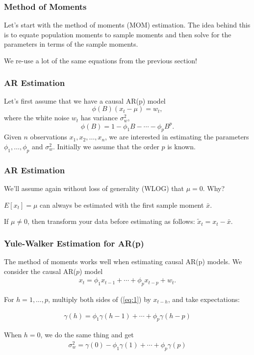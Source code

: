 \documentclass[%
xcolor=pdftex]{beamer}
\begin{document}
\begin{frame}
\frametitle{Method of Moments}

Let's start with the method of moments (MOM) estimation. The idea behind this is to equate population moments to sample moments and then solve for the parameters in terms of the sample moments.
\newline

We re-use a lot of the same equations from the previous section!

\end{frame}


\begin{frame}
\frametitle{AR Estimation}

Let's first assume that we have a causal AR(p) model
$$
\phi(B)  (x_t - \mu) = w_t,
$$
where the white noise $w_t$ has variance $\sigma^2_w$,
$$
\phi(B) = 1-\phi_1 B - \cdots - \phi_p B^p .
$$
Given $n$ observations $x_1,x_2,\ldots,x_n$, we are interested in estimating the parameters $\phi_1,\ldots,\phi_p$ and $\sigma^2_w$. Initially we assume that the order $p$ is known.
\end{frame}

\begin{frame}
\frametitle{AR Estimation}

We'll assume again without loss of generality (WLOG) that $\mu = 0$. Why?
\newline

$E[x_t] = \mu$ can always be estimated with the first sample moment $\bar{x}$. 
\newline

If $\mu \neq 0$, then transform your data before estimating as follows:
$\tilde{x}_t = x_t - \bar{x}$.
\end{frame}



\begin{frame}
\frametitle{Yule-Walker Estimation for AR(p)}

The method of moments works well when estimating causal AR(p) models. We consider the causal AR($p$) model
\begin{eqnarray}\label{eq:1}
x_t= \phi_1 x_{t-1} + \cdots + \phi_p x_{t-p} + w_t.
\end{eqnarray}

For $h=1,\ldots,p$, multiply both sides of (\ref{eq:1}) by $x_{t-h}$, and take expectations:

\begin{eqnarray}\label{eq:2}
\gamma(h)  = \phi_1 \gamma(h-1) + \cdots + \phi_p \gamma(h-p)
\end{eqnarray}

When $h=0$, we do the same thing and get
\begin{eqnarray}
\sigma^2_w  = \gamma(0) - \phi_1 \gamma(1) + \cdots + \phi_p \gamma(p)
\end{eqnarray}

\end{frame}
\end{document}
